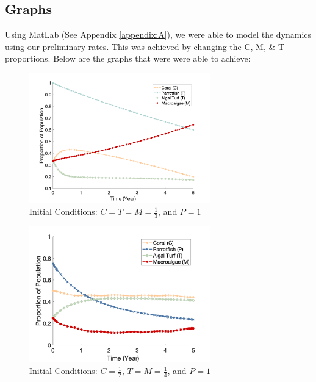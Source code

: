 \documentclass[12pt]{article}
\begin{document}
\subsection{Graphs}
Using MatLab (See Appendix \ref{appendix:A}), we were able to model the dynamics using our preliminary rates. This was achieved by changing the C, M, \& T proportions. Below are the graphs that were were able to achieve:\\
\begin{figure}[H]
    \centering
    \includegraphics[width=0.7\textwidth]{Latex/Figures/initial_matlab_plot.png}
    \caption{Initial Conditions: $C = T = M = \frac{1}{3}$, and $P = 1$}
    \label{fig:initial_plot}
\end{figure}
\begin{figure}[H]
    \centering
    \includegraphics[width=0.7\textwidth]{Latex/Figures/0.5C_0.25T_0.25M.png}
    \caption{Initial Conditions: $C = \frac{1}{2}$, $T = M = \frac{1}{4}$, and $P = 1$}
    \label{fig:coral_dominant}
\end{figure}
\end{document}
